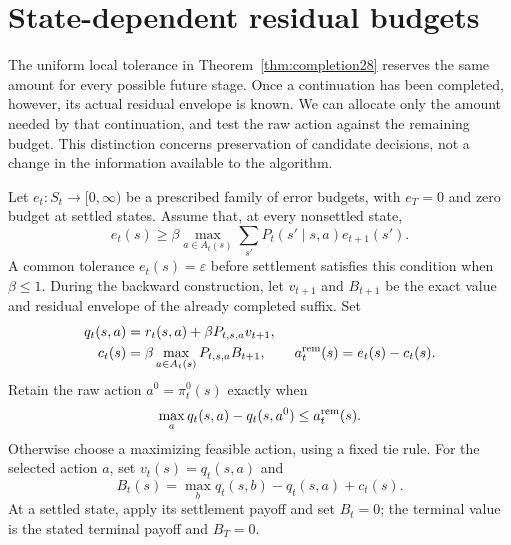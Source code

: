 
\section{State-dependent residual budgets}\label{sec:budget29}
The uniform local tolerance in Theorem~\ref{thm:completion28} reserves the same amount for every possible future stage. Once a continuation has been completed, however, its actual residual envelope is known. We can allocate only the amount needed by that continuation, and test the raw action against the remaining budget. This distinction concerns preservation of candidate decisions, not a change in the information available to the algorithm.

Let $e_t:S_t\to[0,\infty)$ be a prescribed family of error budgets, with $e_T=0$ and zero budget at settled states. Assume that, at every nonsettled state,
\begin{equation}\label{eq:superbudget29}
 e_t(s)\ge\beta\max_{a\in A_t(s)}\sum_{s'}P_t(s'\mid s,a)e_{t+1}(s').
\end{equation}
A common tolerance $e_t(s)=\varepsilon$ before settlement satisfies this condition when $\beta\le1$. During the backward construction, let $v_{t+1}$ and $B_{t+1}$ be the exact value and residual envelope of the already completed suffix. Set
\begin{align}
 q_t(s,a)&=r_t(s,a)+\beta P_{t,s,a}v_{t+1},\\
 c_t(s)&=\beta\max_{a\in A_t(s)}P_{t,s,a}B_{t+1},\qquad
 a_t^{\rm rem}(s)=e_t(s)-c_t(s).\label{eq:allowance29}
\end{align}
Retain the raw action $a^0=\pi^0_t(s)$ exactly when
\begin{equation}\label{eq:retain29}
 \max_a q_t(s,a)-q_t(s,a^0)\le a_t^{\rm rem}(s).
\end{equation}
Otherwise choose a maximizing feasible action, using a fixed tie rule. For the selected action $a$, set $v_t(s)=q_t(s,a)$ and
\begin{equation}\label{eq:budgetrec29}
 B_t(s)=\max_b q_t(s,b)-q_t(s,a)+c_t(s).
\end{equation}
At a settled state, apply its settlement payoff and set $B_t=0$; the terminal value is the stated terminal payoff and $B_T=0$.


